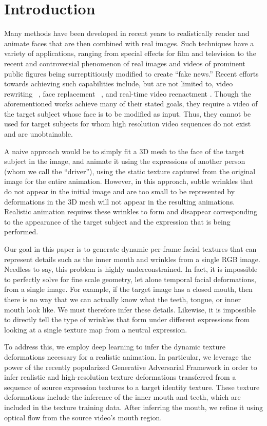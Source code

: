 \section{Introduction}

Many methods have been developed in recent years to realistically render and animate faces that are then combined with real images. Such techniques have a variety of applications, ranging from special effects for film and television to the recent and controversial phenomenon of real images and videos of prominent public figures being surreptitiously modified to create ``fake news.'' Recent efforts towards achieving such capabilities include, but are not limited to, video rewriting ~\cite{rewrite}, face replacement ~\cite{replace}, and real-time video reenactment \cite{f2f}. Though the aforementioned works achieve many of their stated goals, they require a video of the target subject whose face is to be modified as input.  
Thus, they cannot be used for target subjects for whom high resolution video sequences do not exist and are unobtainable.

A naive approach would be to simply fit a 3D mesh to the face of the target subject in the image, and animate it using the expressions of another person (whom we call the ``driver''), using the 
static texture captured from the original image for the entire animation.  However, in this approach, subtle wrinkles that do not appear in the initial image and are too small to be represented by deformations in the 3D mesh will not appear in the resulting animations. Realistic animation requires these wrinkles to form and disappear corresponding to the appearance of the target subject and the expression that is being performed.

Our goal in this paper is to generate dynamic per-frame facial textures that can represent details such as the inner mouth and wrinkles from a single RGB image. Needless to say, this problem is highly underconstrained.  In fact, it is impossible to perfectly solve for fine scale geometry, let alone temporal facial deformations, from a single image.  For example, if the target image has a closed mouth, then there is no way that we can actually know what the teeth, tongue, or inner mouth look like. We must therefore infer these details.  Likewise, it is
impossible to directly tell the type of wrinkles that form under different expressions from looking at a single texture map from a neutral expression.


To address this, we employ deep learning to infer the dynamic texture deformations necessary for a realistic animation.  In particular, we leverage the power of the recently popularized Generative Adversarial Framework \cite{gan} in order to infer realistic and high-resolution texture deformations transferred from a sequence of source expression textures to a target identity texture.  These texture deformations include the inference of the inner mouth and teeth, which are included in the texture training data.  After inferring the mouth, we refine it using optical flow from the source video's mouth region.

